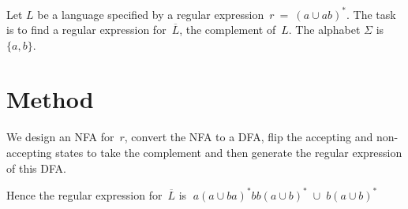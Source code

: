 \documentclass[12pt,letterpaper]{article}
\begin{document}
Let $L$ be a language specified by
a regular expression~$r ~ = ~ (a \cup ab)^*$. The task is to find a regular expression for~$\overline{L}$, the
complement of~$L$. The alphabet $\Sigma$ is~$\{ a, b \}$.

\section*{Method}
We design an NFA for~$r$, convert the NFA to a DFA, flip the accepting and
non-accepting states to take the complement and then generate the regular expression of this
DFA.


\newpage



Hence the regular expression for~$\overline{L}$ is $\; a{(a \cup ba)}^* bb{(a\cup b)}^* \; \cup \; b(a \cup b )^*$
\end{document}
